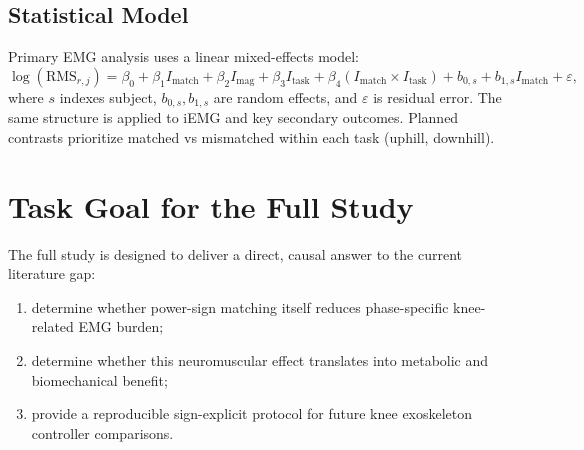 \documentclass[lettersize,journal]{IEEEtran}
\begin{document}
\subsection{Statistical Model}
Primary EMG analysis uses a linear mixed-effects model:
\begin{equation}
\log(\mathrm{RMS}_{r,j}) =
\beta_0 + \beta_1 I_{\mathrm{match}} + \beta_2 I_{\mathrm{mag}} + \beta_3 I_{\mathrm{task}} +
\beta_4(I_{\mathrm{match}}\times I_{\mathrm{task}}) + b_{0,s} + b_{1,s}I_{\mathrm{match}} + \varepsilon,
\label{eq:lmm}
\end{equation}
where $s$ indexes subject, $b_{0,s},b_{1,s}$ are random effects, and $\varepsilon$ is residual error. The same structure is applied to iEMG and key secondary outcomes. Planned contrasts prioritize matched vs mismatched within each task (uphill, downhill).

\section{Task Goal for the Full Study}
The full study is designed to deliver a direct, causal answer to the current literature gap:
\begin{enumerate}
    \item determine whether power-sign matching itself reduces phase-specific knee-related EMG burden;
    \item determine whether this neuromuscular effect translates into metabolic and biomechanical benefit;
    \item provide a reproducible sign-explicit protocol for future knee exoskeleton controller comparisons.
\end{enumerate}



\end{document}
